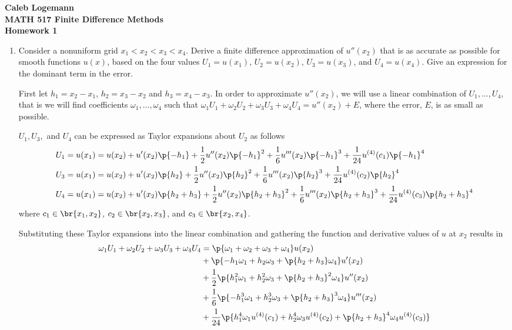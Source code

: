 \documentclass[11pt, oneside]{article}
\begin{document}
\noindent \textbf{\Large{Caleb Logemann \\
MATH 517 Finite Difference Methods \\
Homework 1
}}

\begin{enumerate}
    \item %
        Consider a nonuniform grid $x_1 < x_2 < x_3 < x_4$.
        Derive a finite difference approximation of $u''(x_2)$ that is as
        accurate as possible for smooth functions $u(x)$, based on the four
        values $U_1 = u(x_1)$, $U_2 = u(x_2)$, $U_3 = u(x_3)$, and
        $U_4 = u(x_4)$.
        Give an expression for the dominant term in the error.

        First let $h_1 = x_2 - x_1$, $h_2 = x_3 - x_2$ and $h_3 = x_4 - x_3$.
        In order to approximate $u''(x_2)$, we will use a linear combination of
        $U_1, \ldots, U_4$, that is we will find coefficients
        $\omega_1, \ldots, \omega_4$ such that
        $\omega_1 U_1 + \omega_2 U_2 + \omega_3 U_3 + \omega_4 U_4 = u''(x_2) + E$,
        where the error, $E$, is as small as possible.

        $U_1, U_3,$ and $U_4$ can be expressed as Taylor expansions about $U_2$
        as follows
        \begin{align*}
            U_1 &= u(x_1) = u(x_2) + u'(x_2)\p{-h_1} + \frac{1}{2} u''(x_2)
                \p{-h_1}^2 + \frac{1}{6} u'''(x_2) \p{-h_1}^3 +
                \frac{1}{24} u^{(4)}(c_1) \p{-h_1}^4 \\
            U_3 &= u(x_1) = u(x_2) + u'(x_2)\p{h_2} + \frac{1}{2} u''(x_2)
                \p{h_2}^2 + \frac{1}{6} u'''(x_2) \p{h_2}^3 +
                \frac{1}{24} u^{(4)}(c_2) \p{h_2}^4 \\
            U_4 &= u(x_1) = u(x_2) + u'(x_2)\p{h_2 + h_3} + \frac{1}{2} u''(x_2)
                \p{h_2 + h_3}^2 + \frac{1}{6} u'''(x_2) \p{h_2 + h_3}^3 +
                \frac{1}{24} u^{(4)}(c_3) \p{h_2 + h_3}^4
        \end{align*}
        where $c_1 \in \br{x_1, x_2}$, $c_2 \in \br{x_2, x_3}$, and
        $c_3 \in \br{x_2, x_4}$.

        Substituting these Taylor expansions into the linear combination and
        gathering the function and derivative values of $u$ at $x_2$ results in
        \begin{align*}
            \omega_1 U_1 + \omega_2 U_2 + \omega_3 U_3 + \omega_4 U_4 &=
                \p{\omega_1 + \omega_2 + \omega_3 + \omega_4} u(x_2) \\
                &+ \p{-h_1 \omega_1 + h_2 \omega_3 + \p{h_2 + h_3} \omega_4} u'(x_2) \\
                &+ \frac{1}{2}\p{h_1^2 \omega_1 + h_2^2 \omega_3 + \p{h_2 + h_3}^2 \omega_4} u''(x_2) \\
                &+ \frac{1}{6}\p{-h_1^3 \omega_1 + h_2^3 \omega_3 + \p{h_2 + h_3}^3 \omega_4} u'''(x_2) \\
                &+ \frac{1}{24}\p{h_1^4 \omega_1 u^{(4)}(c_1) + h_2^4 \omega_3 u^{(4)}(c_2)+ \p{h_2 + h_3}^4 \omega_4 u^{(4)}(c_3)}
        \end{align*}


\end{enumerate}
\end{document}
